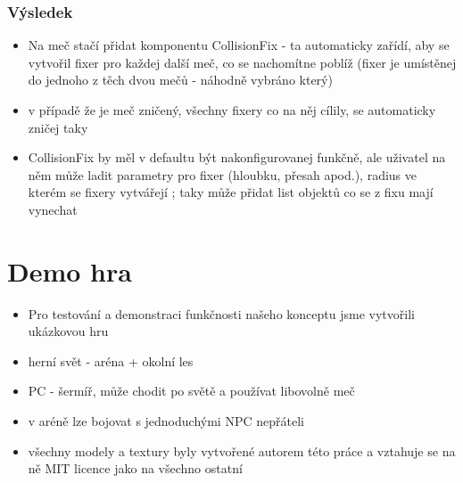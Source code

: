 \subsubsection*{Výsledek}
\begin{itemize}
  \item Na meč stačí přidat komponentu CollisionFix - ta automaticky zařídí, aby se vytvořil fixer pro každej další meč, co se nachomítne poblíž (fixer je umístěnej do jednoho z těch dvou mečů - náhodně vybráno který)
  \item v případě že je meč zničený, všechny fixery co na něj cílily, se automaticky zničej taky
  \item CollisionFix by měl v defaultu být nakonfigurovanej funkčně, ale uživatel na něm může ladit parametry pro fixer (hloubku, přesah apod.), radius ve kterém se fixery vytvářejí ; taky může přidat list objektů co se z fixu mají vynechat
\end{itemize}





\section{Demo hra}
\begin{itemize}
  \item Pro testování a demonstraci funkčnosti našeho konceptu jsme vytvořili ukázkovou hru
  \item herní svět - aréna + okolní les
  \item PC - šermíř, může chodit po světě a používat libovolně meč
  \item v aréně lze bojovat s jednoduchými NPC nepřáteli
  \item všechny modely a textury byly vytvořené autorem této práce a vztahuje se na ně MIT licence jako na všechno ostatní
\end{itemize}

